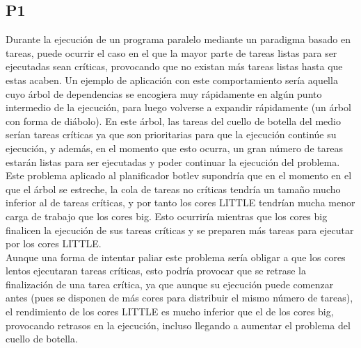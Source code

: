 \subsection{P1}
Durante la ejecución de un programa paralelo mediante un paradigma basado
en tareas, puede ocurrir el caso en el que la mayor parte de tareas listas
para ser ejecutadas sean críticas, provocando que no existan más tareas
listas hasta que estas acaben. Un ejemplo de aplicación con este
comportamiento sería aquella cuyo árbol de dependencias se encogiera muy
rápidamente en algún punto intermedio de la ejecución, para luego volverse
a expandir rápidamente (un árbol con forma de diábolo). En este árbol, las
tareas del cuello de botella del medio serían tareas críticas ya que son
prioritarias para que la ejecución continúe su ejecución, y además, en el
momento que esto ocurra, un gran número de tareas estarán listas para ser
ejecutadas y
poder continuar la ejecución del problema.\\
Este problema aplicado al planificador botlev supondría que en el momento
en el que el árbol se estreche, la cola de tareas no críticas tendría un
tamaño mucho inferior al de tareas críticas, y por tanto los cores LITTLE
tendrían mucha menor carga de trabajo que los cores big. Esto ocurriría
mientras que los cores big finalicen la ejecución de sus tareas críticas y
se preparen más tareas para ejecutar por los cores LITTLE.\\
Aunque una forma de intentar paliar este problema sería obligar a que los
cores lentos ejecutaran tareas críticas, esto podría provocar que se
retrase la finalización de una tarea crítica, ya que aunque su ejecución
puede comenzar antes (pues se disponen de más cores para distribuir el
mismo número de tareas), el rendimiento de los cores LITTLE es mucho
inferior que el de los cores big, provocando retrasos en la ejecución,
incluso llegando a aumentar el problema del cuello de botella.

